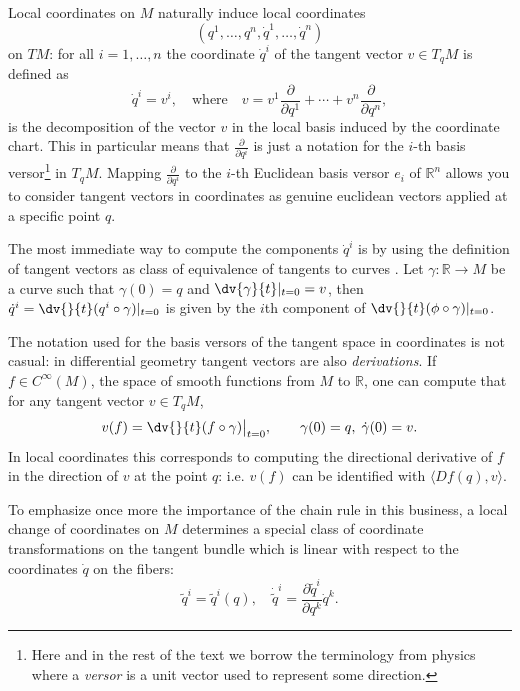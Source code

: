 \documentclass[english,fontsize=11pt,paper=b5]{scrbook}
\theoremstyle{definition}
\begin{document}
    Local coordinates on $M$ naturally induce local coordinates \[(q^1,\ldots,q^n,\dot q^1, \ldots,\dot q^n)\] on $TM$: for all $i=1,\ldots,n$ the coordinate $\dot q^i$ of the tangent vector $v\in T_qM$ is defined as
    \begin{equation}
      \dot q^i = v^i,\quad\mbox{where}\quad v = v^1\frac{\partial}{\partial q^1}+\cdots+v^n \frac{\partial}{\partial q^n},
    \end{equation}
    is the decomposition of the vector $v$ in the local basis induced by the coordinate chart.
    This in particular means that $\frac{\partial}{\partial q^i}$ is just a notation for the $i$-th basis versor\footnote{Here and in the rest of the text we borrow the terminology from physics where a \emph{versor} is a unit vector used to represent some direction.} in $T_q M$.
    Mapping $\frac{\partial}{\partial q^i}$ to the $i$-th Euclidean basis versor $e_i$ of $\mathbb{R}^n$ allows you to consider tangent vectors in coordinates as genuine euclidean vectors applied at a specific point $q$.

    The most immediate way to compute the components $\dot q^i$ is by using the definition of tangent vectors as class of equivalence of tangents to curves \cite[Chapter 2.5]{lectures:aom:seri}.
    Let $\gamma:\mathbb{R} \to M$ be a curve such that $\gamma(0) = q$ and $\dv{\gamma}{t}|_{t=0} = v$, then $\dot q^i = \dv{}{t}(q^i\circ\gamma)|_{t=0}$ is given by the $i$th component of $\dv{}{t}(\phi\circ\gamma)|_{t=0}$.

    The notation used for the basis versors of the tangent space in coordinates is not casual: in differential geometry tangent vectors are also \emph{derivations}. If $f\in C^\infty(M)$, the space of smooth functions from $M$ to $\mathbb{R}$, one can compute that for any tangent vector $v\in T_qM$,
    \begin{equation}
      v(f)=\dv{}{t}(f\circ\gamma)\big|_{t=0}, \qquad \gamma(0) = q, \; \dot \gamma(0) = v.
    \end{equation}
    In local coordinates this corresponds to computing the directional derivative of $f$ in the direction of $v$ at the point $q$: i.e. $v(f)$ can be identified with $\langle Df(q),v\rangle$.

    To emphasize once more the importance of the chain rule in this business, a local change of coordinates on $M$ determines a special class of coordinate transformations on the tangent bundle which is linear with respect to the coordinates $\dot q$ on the fibers:
    \begin{equation}
      \widetilde q^i = \widetilde q^i (q), \quad \dot{\widetilde q}^i = \frac{\partial\widetilde q^i}{\partial q^k}\dot q^k.
    \end{equation}
\end{document}

